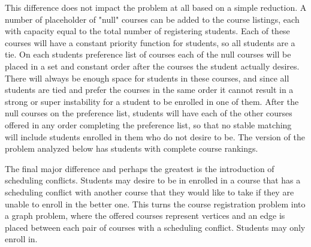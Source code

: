 \documentclass{article}
\begin{document}
This difference does not impact the problem at all based on a simple reduction. A number of placeholder of "null" courses can be added to the course listings, each with capacity equal to the total number of registering students. Each of these courses will have a constant priority function for students, so all students are a tie. On each students preference list of courses each of the null courses will be placed in a set and constant order after the courses the student actually desires. There will always be enough space for students in these courses, and since all students are tied and prefer the courses in the same order it cannot result in a strong or super instability for a student to be enrolled in one of them. After the null courses on the preference list, students will have each of the other courses offered in any order completing the preference list, so that no stable matching will include students enrolled in them who do not desire to be. The version of the problem analyzed below has students with complete course rankings.\\\par

The final major difference and perhaps the greatest is the introduction of scheduling conflicts. Students may desire to be in enrolled in a course that has a scheduling conflict with another course that they would like to take if they are unable to enroll in the better one. This turns the course registration problem into a graph problem, where the offered courses represent vertices and an edge is placed between each pair of courses with a scheduling conflict. Students may only enroll in.\\\par
\end{document}
